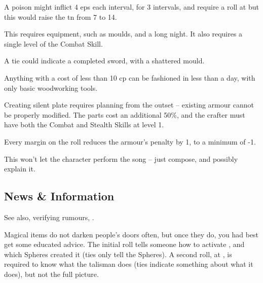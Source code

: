 \begin{multicols}{2}
A poison might inflict 4 \glspl{ep} each \gls{interval}, for 3 \glspl{interval}, and require a  roll at \tn[10] but this would raise the \gls{tn} from 7 to 14.


This requires equipment, such as moulds, and a long night.
It also requires a single level of the Combat Skill.

A tie could indicate a completed sword, with a shattered mould.

Anything with a cost of less than 10 \gls{cp} can be fashioned in less than a day, with only basic woodworking tools.

Creating silent plate requires planning from the outset -- existing armour cannot be properly modified.
The parts cost an additional 50\%, and the crafter must have both the Combat and Stealth Skills at level 1.

Every margin on the roll reduces the armour's penalty by 1, to a minimum of -1.

This won't let the character perform the song -- just compose, and possibly explain it.


\subsection{News \& Information}

See also, verifying rumours, .

Magical items do not darken people's doors often, but once they do, you had best get some educated advice.
The initial roll tells someone how to activate , and which Spheres created it (ties only tell the Spheres).
A second roll, at \tn[14], is required to know what the \gls{talisman} does (ties indicate something about what it does), but not the full picture.



\end{multicols}
